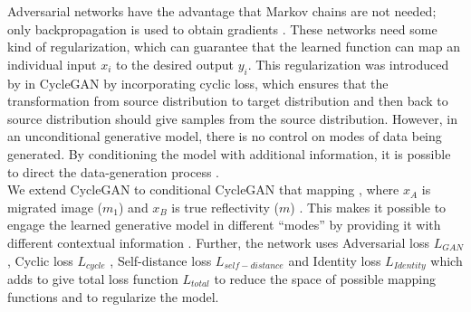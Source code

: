 Adversarial networks have the advantage that Markov chains are not needed; only backpropagation is used to obtain gradients \cite[]{mirza2014conditional}. These networks need some kind of regularization, which can guarantee that the learned function can map an individual input $x_i$ to the desired output $y_i$. This regularization was introduced by \cite {zhu2017unpaired} in CycleGAN by incorporating cyclic loss, which ensures that the transformation from source distribution to target distribution and then back to source distribution should give samples from the source distribution. However, in an unconditional generative model, there is no control on modes of data being generated. By conditioning the model with additional information, it is possible to direct the data-generation process \cite[]{mirza2014conditional}. \\


We extend CycleGAN to conditional CycleGAN  that mapping   \cite[]{lu2017conditional}, where $x_A$ is migrated image ($m_1$)  and $x_B$ is true reflectivity ($m$) . This makes it possible to engage the learned generative model in different ``modes'' by providing it with different contextual information \cite[]{gauthier2014conditional}. Further, the network uses Adversarial loss $L_{GAN}$ \cite[]{goodfellow2014generative,benaim2017one,zhu2017unpaired}, Cyclic loss $L_{cycle}$ \cite[]{zhu2017unpaired}, Self-distance loss $L_{self-distance}$ \cite[]{benaim2017one,selfdistance} and Identity loss $L_{Identity}$ \cite[]{zhu2017unpaired} which adds to give total loss function $L_{total}$ to reduce the space of possible mapping functions and to regularize the model.

